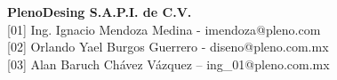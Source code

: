\def\vhhistoryname{Revisión}%
\def\vhversionname{Versión}%
\def\vhdatename{Fecha}%
\def\vhauthorname{Autor}%
\def\vhchangename{Descripción}%

\begin{versionhistory}
\end{versionhistory}

\vfill 

\noindent\large\textbf{PlenoDesing S.A.P.I. de C.V.}\\

\noindent\normalsize [01] Ing. Ignacio Mendoza Medina - imendoza@pleno.com\\
\noindent\normalsize [02] Orlando Yael Burgos Guerrero - diseno@pleno.com.mx\\
\noindent\normalsize [03] Alan Baruch Chávez Vázquez – ing\_01@pleno.com.mx\\
\\


